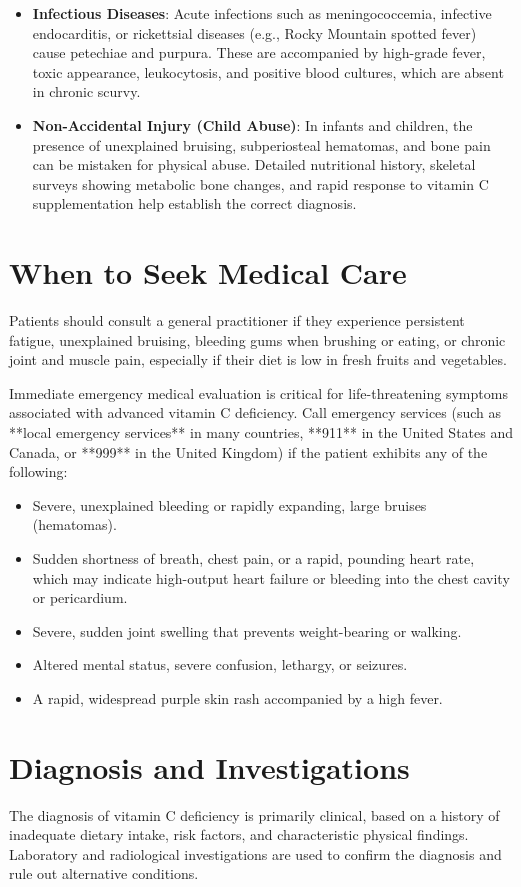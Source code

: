 \begin{itemize}
    \item \textbf{Infectious Diseases}: Acute infections such as meningococcemia, infective endocarditis, or rickettsial diseases (e.g., Rocky Mountain spotted fever) cause petechiae and purpura. These are accompanied by high-grade fever, toxic appearance, leukocytosis, and positive blood cultures, which are absent in chronic scurvy.
    \item \textbf{Non-Accidental Injury (Child Abuse)}: In infants and children, the presence of unexplained bruising, subperiosteal hematomas, and bone pain can be mistaken for physical abuse. Detailed nutritional history, skeletal surveys showing metabolic bone changes, and rapid response to vitamin C supplementation help establish the correct diagnosis.
\end{itemize}

\section*{When to Seek Medical Care}
Patients should consult a general practitioner if they experience persistent fatigue, unexplained bruising, bleeding gums when brushing or eating, or chronic joint and muscle pain, especially if their diet is low in fresh fruits and vegetables.

Immediate emergency medical evaluation is critical for life-threatening symptoms associated with advanced vitamin C deficiency. Call emergency services (such as **local emergency services** in many countries, **911** in the United States and Canada, or **999** in the United Kingdom) if the patient exhibits any of the following:
\begin{itemize}
    \item Severe, unexplained bleeding or rapidly expanding, large bruises (hematomas).
    \item Sudden shortness of breath, chest pain, or a rapid, pounding heart rate, which may indicate high-output heart failure or bleeding into the chest cavity or pericardium.
    \item Severe, sudden joint swelling that prevents weight-bearing or walking.
    \item Altered mental status, severe confusion, lethargy, or seizures.
    \item A rapid, widespread purple skin rash accompanied by a high fever.
\end{itemize}

\section*{Diagnosis and Investigations}
The diagnosis of vitamin C deficiency is primarily clinical, based on a history of inadequate dietary intake, risk factors, and characteristic physical findings. Laboratory and radiological investigations are used to confirm the diagnosis and rule out alternative conditions.

